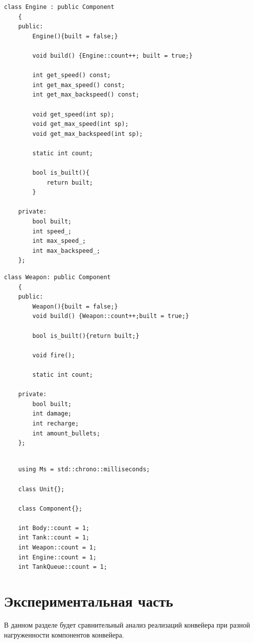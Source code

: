 \documentclass[a4paper, 14pt]{article}
\begin{document}
	\begin{lstlisting}[label=code:Engine,caption=Вспомогательный класс Engine.]
    class Engine : public Component
    {
    public:
        Engine(){built = false;}
    
        void build() {Engine::count++; built = true;}
    
        int get_speed() const;
        int get_max_speed() const;
        int get_max_backspeed() const;
    
        void get_speed(int sp);
        void get_max_speed(int sp);
        void get_max_backspeed(int sp);
    
        static int count;
    
        bool is_built(){
            return built;
        }
        
    private:
        bool built;
        int speed_;
        int max_speed_;
        int max_backspeed_;
    };
	\end{lstlisting}
	
	\begin{lstlisting}[label=code:Weapon,caption=Вспомогательный класс Weapon.]
   class Weapon: public Component
    {
    public:
        Weapon(){built = false;}
        void build() {Weapon::count++;built = true;}
    
        bool is_built(){return built;}
    
        void fire();
    
        static int count;
        
    private:
        bool built;
        int damage;
        int recharge;
        int amount_bullets;
    };
	\end{lstlisting}
	
		\begin{lstlisting}[label=code:extra,caption=Дополнительные классы и определение статических переменных.]
		
	using Ms = std::chrono::milliseconds;

    class Unit{};
    
    class Component{};
		
    int Body::count = 1;
    int Tank::count = 1;
    int Weapon::count = 1;
    int Engine::count = 1;
    int TankQueue::count = 1;
	\end{lstlisting}
	
    \newpage
	\section{Экспериментальная часть}
	\hspace{1cm} В данном разделе будет сравнительный анализ реализаций конвейера при разной нагруженности компонентов конвейера.
    
\end{document}
